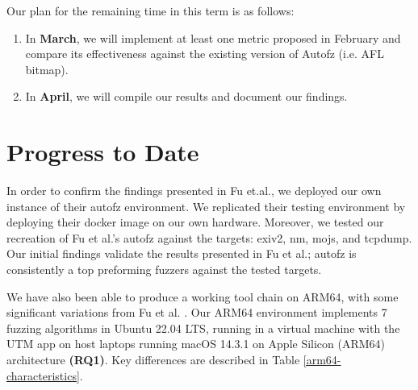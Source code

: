 Our plan for the remaining time in this term is as follows:

\begin{enumerate}
    \item In \textbf{March}, we will implement at least one metric proposed in February
     and compare its effectiveness against the existing version of Autofz (i.e. AFL bitmap).

    \item In \textbf{April}, we will compile our results and document our findings.
\end{enumerate}

\section{Progress to Date}
In order to confirm the findings presented in Fu et.al.\cite{Fu}, we deployed our own instance of 
their autofz environment. We replicated their testing environment by deploying their docker image 
on our own hardware. Moreover, we tested our recreation of Fu et al.'s autofz against the targets: 
exiv2, nm, mojs, and tcpdump. Our initial findings validate the results presented in Fu et al.; 
autofz is consistently a top preforming fuzzers against the tested targets. 

We have also been able to produce a working tool chain on ARM64, with some significant variations
from Fu et al. \cite{Fu}. Our ARM64 environment implements 7 fuzzing algorithms in
Ubuntu 22.04 LTS, running in a virtual machine with the UTM app on host laptops running
macOS 14.3.1 on Apple Silicon (ARM64) architecture \textbf{(RQ1)}. Key differences are
described in Table \ref{arm64-characteristics}.

